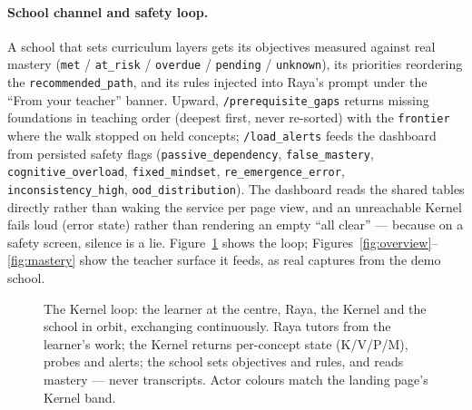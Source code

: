\documentclass[11pt,a4paper]{article}
\begin{document}
\paragraph{School channel and safety loop.} A school that sets curriculum
layers gets its objectives measured against real mastery (\texttt{met} /
\texttt{at\_risk} / \texttt{overdue} / \texttt{pending} / \texttt{unknown}),
its priorities reordering the \texttt{recommended\_path}, and its rules
injected into Raya's prompt under the ``From your teacher'' banner. Upward,
\texttt{/prerequisite\_gaps} returns missing foundations in teaching order
(deepest first, never re-sorted) with the \texttt{frontier} where the walk
stopped on held concepts; \texttt{/load\_alerts} feeds the dashboard from
persisted safety flags (\texttt{passive\_dependency},
\texttt{false\_mastery}, \texttt{cognitive\_overload},
\texttt{fixed\_mindset}, \texttt{re\_emergence\_error},
\texttt{inconsistency\_high}, \texttt{ood\_distribution}). The dashboard reads
the shared tables directly rather than waking the service per page view, and
an unreachable Kernel fails loud (error state) rather than rendering an empty
``all clear'' --- because on a safety screen, silence is a lie.
Figure~\ref{fig:kernel} shows the loop; Figures~\ref{fig:overview}--\ref{fig:mastery}
show the teacher surface it feeds, as real captures from the demo school.

\begin{figure}[h]
\centering
{}
\caption{The Kernel loop: the learner at the centre, Raya, the Kernel and the
school in orbit, exchanging continuously. Raya tutors from the learner's work;
the Kernel returns per-concept state (K/V/P/M), probes and alerts; the school
sets objectives and rules, and reads mastery --- never transcripts. Actor
colours match the landing page's Kernel band.}
\label{fig:kernel}
\end{figure}
\end{document}
